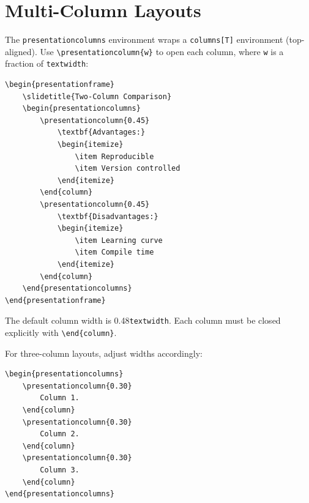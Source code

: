 \section{Multi-Column Layouts}

The \texttt{presentationcolumns} environment wraps a \texttt{columns[T]}
environment (top-aligned).  Use \texttt{\textbackslash presentationcolumn\{w\}}
to open each column, where \texttt{w} is a fraction of \texttt{textwidth}:

\begin{verbatim}
\begin{presentationframe}
    \slidetitle{Two-Column Comparison}
    \begin{presentationcolumns}
        \presentationcolumn{0.45}
            \textbf{Advantages:}
            \begin{itemize}
                \item Reproducible
                \item Version controlled
            \end{itemize}
        \end{column}
        \presentationcolumn{0.45}
            \textbf{Disadvantages:}
            \begin{itemize}
                \item Learning curve
                \item Compile time
            \end{itemize}
        \end{column}
    \end{presentationcolumns}
\end{presentationframe}
\end{verbatim}

The default column width is 0.48\texttt{textwidth}.  Each column must be
closed explicitly with \texttt{\textbackslash end\{column\}}.

For three-column layouts, adjust widths accordingly:

\begin{verbatim}
\begin{presentationcolumns}
    \presentationcolumn{0.30}
        Column 1.
    \end{column}
    \presentationcolumn{0.30}
        Column 2.
    \end{column}
    \presentationcolumn{0.30}
        Column 3.
    \end{column}
\end{presentationcolumns}
\end{verbatim}

